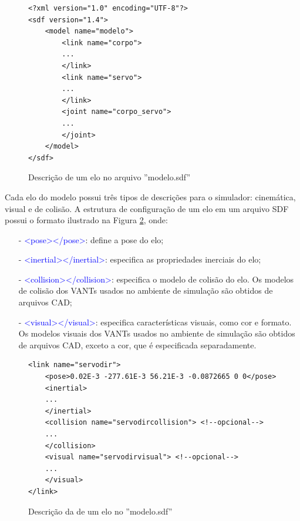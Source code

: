 \begin{figure}[H]
\begin{verbatim}
<?xml version="1.0" encoding="UTF-8"?>
<sdf version="1.4">
	<model name="modelo">
		<link name="corpo">
		...
		</link>
		<link name="servo">
		...
		</link>
		<joint name="corpo_servo">
		...
		</joint>
	</model>
</sdf>
\end{verbatim}
\vspace{-1cm}
\caption{Descrição de um elo no arquivo ''modelo.sdf''}
\label{geral}
\end{figure}


Cada elo do modelo possui três tipos de descrições para o simulador: cinemática, visual e de colisão.  A estrutura de configuração de um elo em um arquivo SDF possui o formato ilustrado na Figura \ref{elo}, onde:
\small
\begin{itemize}
\setlength{\itemsep}{1pt}
\setlength{\parskip}{0pt}
\setlength{\parsep}{0pt}
\item[-] \textcolor{blue}{<pose></pose>}: define a pose do elo;
\item[-] \textcolor{blue}{<inertial></inertial>}: especifica as propriedades inerciais do elo;
\item[-] \textcolor{blue}{<collision></collision>}: especifica o modelo de colisão do elo. Os modelos de colisão dos VANTs usados no ambiente de simulação são obtidos de arquivos CAD;
\item[-] \textcolor{blue}{<visual></visual>}: especifica características visuais, como cor e formato. Os modelos visuais dos VANTs usados no ambiente de simulação são obtidos de arquivos CAD, exceto a cor, que é especificada separadamente.
\end{itemize}\normalsize

\begin{figure}[ht!]
\begin{verbatim}
<link name="servodir">
	<pose>0.02E-3 -277.61E-3 56.21E-3 -0.0872665 0 0</pose>
	<inertial> 
	...
	</inertial>
	<collision name="servodircollision"> <!--opcional-->
	...
	</collision>
	<visual name="servodirvisual"> <!--opcional-->
	...
	</visual>
</link>
\end{verbatim}
\vspace{-1cm}
\caption{Descrição da de um elo no ''modelo.sdf''}
\label{elo}
\end{figure}

